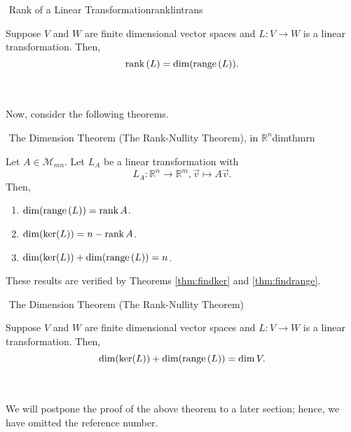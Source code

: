         \begin{definition}{\Stop\,\,Rank of a Linear Transformation}{ranklintrans}

            Suppose \(V\) and \(W\) are finite dimensional vector spaces and \(L:V\to W\) is a linear transformation. Then,
            \begin{equation*}
                \text{rank\,}(L)=\dim(\text{range\,}(L)).
            \end{equation*}
            
        \end{definition}
        \vphantom
        \\
        \\
        Now, consider the following theorems.
        \begin{theorem}{\Stop\,\,The Dimension Theorem (The Rank-Nullity Theorem), in \(\mathbb{R}^n\)}{dimthmrn}

            Let \(A\in\mathcal{M}_{mn}\). Let \(L_A\) be a linear transformation with
            \begin{equation*}
                L_A:\mathbb{R}^n\to\mathbb{R}^m, \vec{v}\mapsto A\vec{v}.
            \end{equation*}
            Then,
            \begin{enumerate}
                \item \(\dim(\text{range\,}(L))=\text{rank\,} A\).
                \item \(\dim(\ker(L))=n-\text{rank\,} A\).
                \item \(\dim(\ker(L))+\dim(\text{range\,}(L))=n\).
            \end{enumerate}
            These results are verified by Theorems \ref{thm:findker} and \ref{thm:findrange}.
            
        \end{theorem}
        \begin{theorem*}{\Stop\,\,The Dimension Theorem (The Rank-Nullity Theorem)}

            Suppose \(V\) and \(W\) are finite dimensional vector spaces and \(L:V\to W\) is a linear transformation. Then,
            \begin{equation*}
                \dim(\ker(L))+\dim(\text{range\,}(L))=\dim V.
            \end{equation*}
            
        \end{theorem*}
        \vphantom
        \\
        \\
        We will postpone the proof of the above theorem to a later section; hence, we have omitted the reference number.


